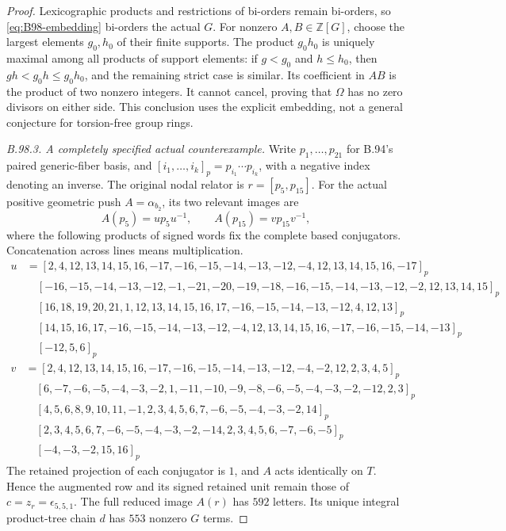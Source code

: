 \begin{proof}
Lexicographic products and restrictions of bi-orders remain
bi-orders, so \eqref{eq:B98-embedding} bi-orders the actual $G$.
For nonzero $A,B\in\mathbb Z[G]$, choose the largest elements
$g_0,h_0$ of their finite supports.  The product $g_0h_0$ is
uniquely maximal among all products of support elements: if
$g<g_0$ and $h\leq h_0$, then
$gh<g_0h\leq g_0h_0$, and the remaining strict case is similar.
Its coefficient in $AB$ is the product of two nonzero integers.
It cannot cancel, proving that $\Omega$ has no zero divisors
on either side.  This conclusion uses the explicit embedding,
not a general conjecture for torsion-free group rings.

\emph{B.98.3. A completely specified actual counterexample.}
Write $p_1,\ldots,p_{21}$ for B.94's paired generic-fiber basis,
and $[i_1,\ldots,i_k]_p=p_{i_1}\cdots p_{i_k}$, with a negative
index denoting an inverse.  The original nodal relator is
$r=[p_5,p_{15}]$.  For the actual positive geometric push
$A=\alpha_{b_2}$, its two relevant images are
\[
 A(p_5)=u p_5u^{-1},\qquad A(p_{15})=v p_{15}v^{-1},
\]
where the following products of signed words fix the complete
based conjugators.  Concatenation across lines means multiplication.
\begingroup\small
\[
\begin{aligned}
u&=[2,4,12,13,14,15,16,-17,-16,-15,-14,-13,-12,-4,12,13,14,15,16,-17]_p\\
&\quad[-16,-15,-14,-13,-12,-1,-21,-20,-19,-18,-16,-15,-14,-13,-12,-2,12,13,14,15]_p\\
&\quad[16,18,19,20,21,1,12,13,14,15,16,17,-16,-15,-14,-13,-12,4,12,13]_p\\
&\quad[14,15,16,17,-16,-15,-14,-13,-12,-4,12,13,14,15,16,-17,-16,-15,-14,-13]_p\\
&\quad[-12,5,6]_p
\end{aligned}
\]
\[
\begin{aligned}
v&=[2,4,12,13,14,15,16,-17,-16,-15,-14,-13,-12,-4,-2,12,2,3,4,5]_p\\
&\quad[6,-7,-6,-5,-4,-3,-2,1,-11,-10,-9,-8,-6,-5,-4,-3,-2,-12,2,3]_p\\
&\quad[4,5,6,8,9,10,11,-1,2,3,4,5,6,7,-6,-5,-4,-3,-2,14]_p\\
&\quad[2,3,4,5,6,7,-6,-5,-4,-3,-2,-14,2,3,4,5,6,-7,-6,-5]_p\\
&\quad[-4,-3,-2,15,16]_p
\end{aligned}
\]
\endgroup
The retained projection of each conjugator is $1$, and $A$
acts identically on $T$.  Hence the augmented row and its
signed retained unit remain those of $c=z_r=\epsilon_{5,5,1}$.
The full reduced image $A(r)$ has $592$ letters.  Its unique
integral product-tree chain $d$ has $553$ nonzero $G$ terms.


\end{proof}
